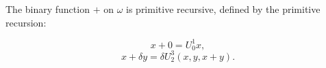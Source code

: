 The binary function $+$ on $\omega$ is primitive recursive, defined by the primitive recursion:

$$x + 0 = U_0^1 x,$$
$$x + \delta y = \delta U_2^3(x, y, x + y).$$
